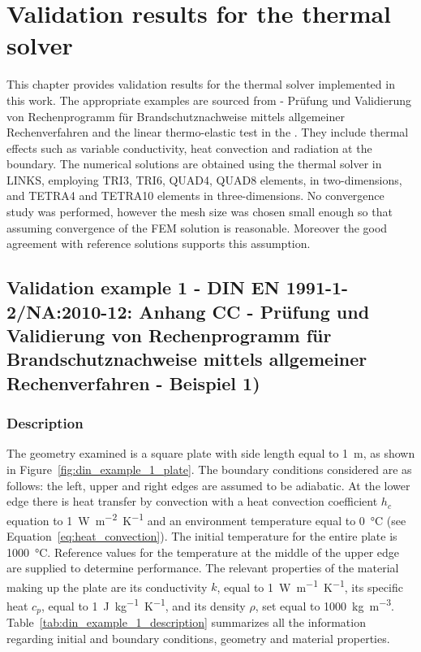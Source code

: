 \chapter{Validation results for the thermal solver}

This chapter provides validation results for the thermal solver implemented in this work.
The appropriate examples are sourced from \cite{DINEN1991_1_2}  - Prüfung und  Validierung von Rechenprogramm für Brand\-schutz\-nach\-weise mittels allgemeiner Rechenverfahren  and the linear thermo-elastic test in the \cite{NAFEMSbenchmarks}.
They include thermal effects such as variable conductivity, heat convection and radiation at the boundary.
The numerical solutions are obtained using the thermal solver in LINKS, employing TRI3, TRI6, QUAD4, QUAD8 elements, in two-dimensions, and TETRA4 and TETRA10 elements in three-dimensions.
No convergence study was performed, however the mesh size was chosen small enough so that assuming convergence of the FEM solution is reasonable.
Moreover the good agreement with reference solutions supports this assumption.

\section{Validation example 1 - DIN EN 1991-1-2/NA:2010-12: Anhang CC - Prüfung und Validierung von Rechenprogramm für Brandschutznachweise mittels allgemeiner Rechenverfahren - Beispiel 1)}

\subsection{Description}

The geometry examined is a square plate with side length equal to \SI{1}{\meter}, as shown in Figure~\ref{fig:din_example_1_plate}.
The boundary conditions considered are as follows: the left, upper and right edges are assumed to be adiabatic.
At the lower edge there is heat transfer by convection with a heat convection coefficient \(h_c\) equation to \SI{1}{\watt\meter^{-2}\kelvin^{-1}} and an environment temperature equal to \SI{0}{\celsius} (see Equation~\ref{eq:heat_convection}).
The initial temperature for the entire plate is \SI{1000}{\celsius}.
Reference values for the temperature at the middle of the upper edge are supplied to determine performance.
The relevant properties of the material making up the plate are its conductivity \(k\), equal to \SI{1}{\watt\meter^{-1}\kelvin^{-1}}, its specific heat \(c_p\), equal to \SI{1}{\joule\kilo\gram^{-1}\kelvin^{-1}}, and its density \(\rho\), set equal to \SI{1000}{\kilo\gram\meter^{-3}}.
Table~\ref{tab:din_example_1_description} summarizes all the information regarding initial and boundary conditions, geometry and material properties.

